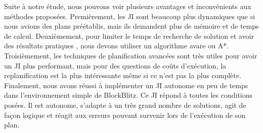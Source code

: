 \documentclass[12pt,letterpaper]{article}
\begin{document}
Suite à notre étude, nous pouvons voir plusieurs avantages et inconvénients aux méthodes proposées. Premièrement, les JI sont beaucoup plus dynamiques que si nous avions des plans préétablis, mais ils demandent plus de mémoire et de temps de calcul. Deuxièmement, pour limiter le temps de recherche de solution et avoir des résultats pratiques , nous devons utiliser un algorithme avare ou A*. Troisièmement, les techniques de planification avancées sont très utiles pour avoir un JI plus performant, mais pour des questions de coûts d'exécution, la replanification est la plus intéressante même si ce n'est pas la plus complète. Finalement, nous avons réussi à implémenter un JI autonome en peu de temps dans l'environnement simple de BlockBlitz. Ce JI répond à toutes les conditions posées. Il est autonome, s'adapte à un très grand nombre de solutions, agit de façon logique et réagit aux erreurs pouvant survenir lors de l'exécution de son plan.
\end{document}
